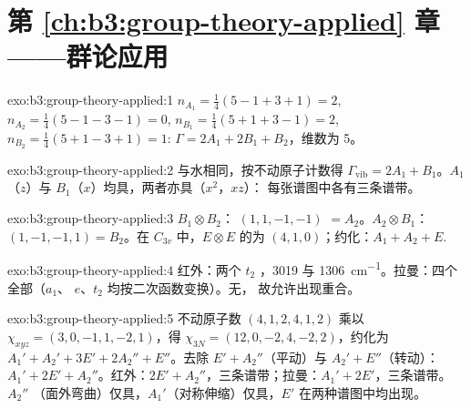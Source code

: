\section*{第 \ref{ch:b3:group-theory-applied} 章——群论应用}

\begin{solution}{exo:b3:group-theory-applied:1}
$n_{A_1} = \frac14(5 - 1 + 3 + 1) = 2$, $n_{A_2} = \frac14(5 - 1 - 3 - 1) = 0$,
$n_{B_1} = \frac14(5 + 1 + 3 - 1) = 2$, $n_{B_2} = \frac14(5 + 1 - 3 + 1) = 1$:
$\Gamma = 2A_1 + 2B_1 + B_2$，维数为 5。
\end{solution}

\begin{solution}{exo:b3:group-theory-applied:2}
与水相同，按不动原子计数得 $\Gamma_{\mathrm{vib}} = 2A_1 + B_1$。$A_1$（$z$）与
$B_1$（$x$）均具，两者亦具（$x^2$，$xz$）：
每张谱图中各有三条谱带。
\end{solution}

\begin{solution}{exo:b3:group-theory-applied:3}
$B_1\otimes B_2$： $(1, 1, -1, -1)$ $= A_2$。$A_2\otimes B_1$：$(1, -1, -1,
1) = B_2$。在 $C_{3v}$ 中，$E\otimes E$ 的为 $(4, 1, 0)$；约化：$A_1 + A_2 +
E$.
\end{solution}

\begin{solution}{exo:b3:group-theory-applied:4}
红外：两个 $t_2$ ，3019 与 \qty{1306}{cm^{-1}}。拉曼：四个全部（$a_1$、
$e$、$t_2$ 均按二次函数变换）。无，
故允许出现重合。
\end{solution}

\begin{solution}{exo:b3:group-theory-applied:5}
不动原子数 $(4, 1, 2, 4, 1, 2)$ 乘以 $\chi_{xyz} = (3, 0, -1, 1, -2, 1)$，得
$\chi_{3N} = (12, 0, -2, 4, -2, 2)$，约化为 $A_1' + A_2' + 3E' + 2A_2'' +
E''$。去除 $E' + A_2''$（平动）与 $A_2' + E''$（转动）：$A_1' + 2E'
+ A_2''$。红外：$2E' + A_2''$，三条谱带；拉曼：$A_1' + 2E'$，三条谱带。$A_2''$
（面外弯曲）仅具，$A_1'$（对称伸缩）仅具，$E'$
在两种谱图中均出现。
\end{solution}

